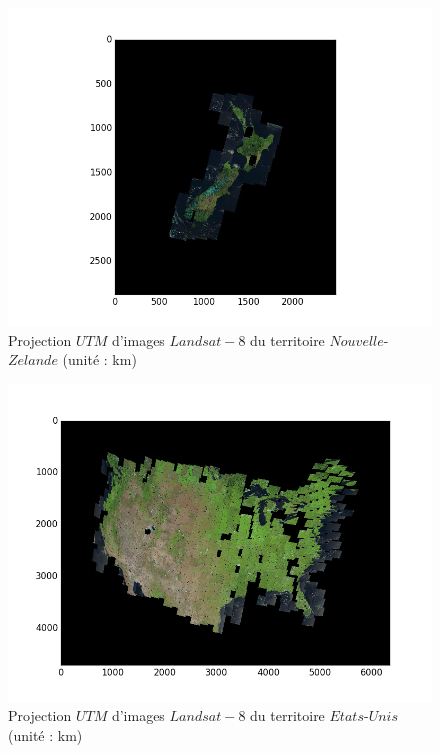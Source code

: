 \documentclass{book}
\begin{document}
\begin{figure}[H]
\begin{center}
\includegraphics[scale=0.8]{images/projection_newzealand.png}
\end{center}
\caption{Projection $UTM$ d'images $Landsat-8$ du territoire $Nouvelle$-$Zelande$ (unité : km)}
\label{projection_newzealand}
\end{figure}
\begin{figure}[H]
\begin{center}
\includegraphics[scale=0.8]{images/projection_usa.png}
\end{center}
\caption{Projection $UTM$ d'images $Landsat-8$ du territoire $Etats$-$Unis$ (unité : km)}
\label{projection_usa}
\end{figure}
\end{document}
